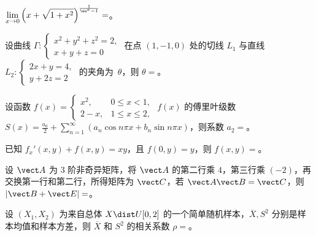 \begin{question}[index=11]
$\displaystyle\lim_{x\to0}\left(x+\sqrt{1+x^2}\right)^{\frac{1}{\eu^x-1}}=$\fillin。
\end{question}
\QuestionBreak

\begin{question}[index=12]
设曲线 $\Gamma:\begin{cases}x^2+y^2+z^2=2,\\x+y+z=0\end{cases}$ 在点 $(1,-1,0)$ 处的切线 $L_1$ 与直线 $L_2:\begin{cases}2x+y=4,\\y+2z=2\end{cases}$ \allowbreak\mbox{的夹角为 $\theta$}，则 $\theta=$\fillin。
\end{question}
\QuestionBreak

\begin{question}[index=13]
设函数 $f(x)=\begin{cases}x^2,&0\leq x<1,\\2-x,&1\leq x\leq2,\end{cases}$ $f(x)$ 的傅里叶级数
$\displaystyle S(x)=\frac{a_0}{2}+\sum_{n=1}^{\infty}(a_n\cos n\pi x+b_n\sin n\pi x)$，则系数 $a_2=$\fillin。
\end{question}
\QuestionBreak

\begin{question}[index=14]
已知 $f_x'(x,y)+f(x,y)=xy$，且 $f(0,y)=y$，则 $f(x,y)=$\fillin。
\end{question}
\QuestionBreak

\begin{question}[index=15]
设 $\vect A$ 为 $3$ 阶非奇异矩阵，将 $\vect A$ 的第二行乘 $4$，第三行乘 $(-2)$，再交换第一行和第二行，\allowbreak\mbox{所得矩阵}为 $\vect C$，若 $\vect A\vect B=\vect C$，则 $|\vect B+\vect E|=$\fillin。
\end{question}
\QuestionBreak

\begin{question}[index=16]
设 $(X_1,X_2)$ 为来自总体 $X\dist U[0,2]$ 的一个简单随机样本，$\overline X,S^2$ 分别是样本均值和样本方差，则 $\overline X$ 和 $S^2$ 的相关系数 $\rho=$\fillin。
\end{question}
